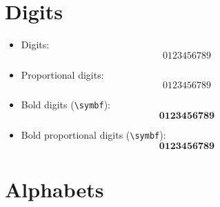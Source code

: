 \documentclass { article }
\begin{document}
\section{Digits}

\begin{itemize}
  \item Digits:
        \[ 0123456789 \]
  \item Proportional digits:
        \begingroup
          \[ 0123456789 \]
        \endgroup
  \item Bold digits (\verb|\symbf|):
        \[ \symbf{0123456789} \]
  \item Bold proportional digits (\verb|\symbf|):
        \begingroup
          \[ \symbf{0123456789} \]
        \endgroup
\end{itemize}

\section{Alphabets}
\end{document}
